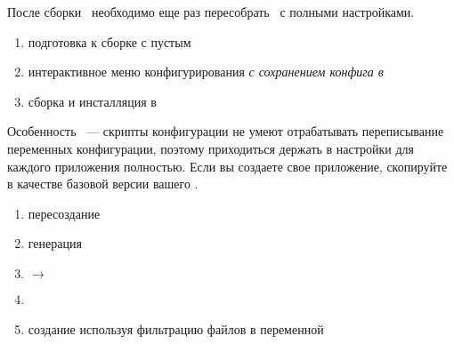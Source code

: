 


 \label{azgcc}

После сборки \ необходимо еще раз пересобрать \ с полными
настройками.

 \label{azbb}


\begin{enumerate}
  \item подготовка к сборке с пустым 
  \item интерактивное меню конфигурирования \emph{с сохранением конфига в
  }
  \item сборка и инсталляция в 
\end{enumerate}

\bigskip
Особенность \ --- скрипты конфигурации не умеют отрабатывать
переписывание переменных конфигурации, поэтому приходиться держать в
 настройки для каждого приложения полностью. Если вы создаете
свое приложение, скопируйте  в качестве базовой версии вашего
.

 \label{azlibs}

\label{azapps}

 \label{azuser}

 \label{azroot}


\begin{enumerate}
  \item пересоздание 
  \item генерация  
  \item {} $\rightarrow$ 
  \item {}
  \item создание  используя фильтрацию файлов  в переменной 
\end{enumerate}

